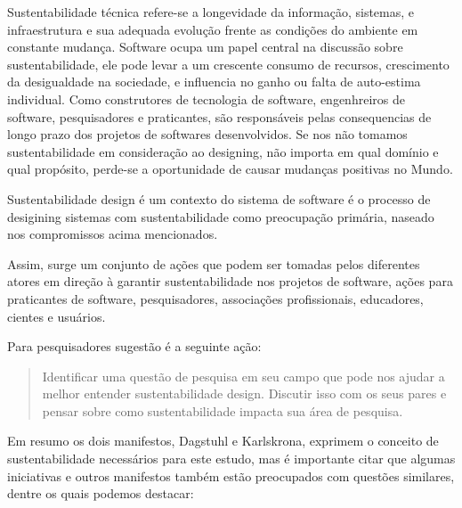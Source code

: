 Sustentabilidade técnica refere-se a longevidade da informação, sistemas, e
infraestrutura e sua adequada evolução frente as condições do ambiente em
constante mudança. Software ocupa um papel central na discussão sobre
sustentabilidade, ele pode levar a um crescente consumo de recursos,
crescimento  da desigualdade na sociedade, e influencia no ganho ou falta de
auto-estima individual. Como construtores de tecnologia de software,
engenhreiros de software, pesquisadores e praticantes, são responsáveis pelas
consequencias de longo prazo dos projetos de softwares desenvolvidos. Se nos
não tomamos sustentabilidade em consideração ao designing, não importa em qual
domínio e qual propósito, perde-se a oportunidade de causar mudanças positivas
no Mundo.

Sustentabilidade design é um contexto do sistema de software é o processo de
desigining sistemas com sustentabilidade como preocupação primária, naseado nos
compromissos acima mencionados.

Assim, surge um conjunto de ações que podem ser tomadas pelos diferentes atores
em direção à garantir sustentabilidade nos projetos de software, ações para
praticantes de software, pesquisadores, associações profissionais, educadores,
cientes e usuários.

Para pesquisadores sugestão é a seguinte ação:

\begin{quote}
  Identificar uma questão de pesquisa em seu campo que pode nos ajudar a melhor
  entender sustentabilidade design. Discutir isso com os seus pares e pensar
  sobre como sustentabilidade impacta sua área de pesquisa.
\end{quote}

Em resumo os dois manifestos, Dagstuhl e Karlskrona, exprimem o conceito de
sustentabilidade necessários para este estudo, mas é importante citar que
algumas iniciativas e outros manifestos também estão preocupados com questões
similares, dentre os quais podemos destacar:

%
%

